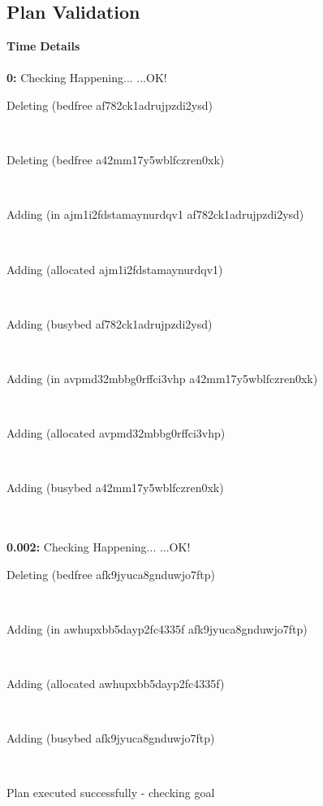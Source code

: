 \documentclass[a4paper,12pt]{article}
\newcommand{\headingtimedetails}{{\bf Time} \qquad \= {\bf Details}\\[0.8ex]}
\newcommand{\atime}[1]{{\bf #1:}}
\newcommand{\exprn}[1]{{\sf #1}}
\newcommand{\checkhappening}{Checking Happening... }
\newcommand{\listrow}[1]{\begin{minipage}[t]{11.5cm} #1 \end{minipage}}
\newcommand{\happeningOK}{...OK!}
\newcommand{\adding}[1]{\listrow{Adding \exprn{#1} }}
\newcommand{\deleting}[1]{\listrow{Deleting \exprn{#1} }}
\begin{document}
\subsection{Plan Validation}
\begin{tabbing}
\headingtimedetails 
\\
\atime{0} \> \checkhappening\happeningOK\\
 \> \deleting{(bedfree af782ck1adrujpzdi2ysd)}\\
 \> \deleting{(bedfree a42mm17y5wblfczren0xk)}\\
 \> \adding{(in ajm1i2fdstamaynurdqv1 af782ck1adrujpzdi2ysd)}\\
 \> \adding{(allocated ajm1i2fdstamaynurdqv1)}\\
 \> \adding{(busybed af782ck1adrujpzdi2ysd)}\\
 \> \adding{(in avpmd32mbbg0rffci3vhp a42mm17y5wblfczren0xk)}\\
 \> \adding{(allocated avpmd32mbbg0rffci3vhp)}\\
 \> \adding{(busybed a42mm17y5wblfczren0xk)}\\
\\
\atime{0.002} \> \checkhappening\happeningOK\\
 \> \deleting{(bedfree afk9jyuca8gnduwjo7ftp)}\\
 \> \adding{(in awhupxbb5dayp2fc4335f afk9jyuca8gnduwjo7ftp)}\\
 \> \adding{(allocated awhupxbb5dayp2fc4335f)}\\
 \> \adding{(busybed afk9jyuca8gnduwjo7ftp)}\\
\end{tabbing}
Plan executed successfully - checking goal\\
\\
\end{document}
